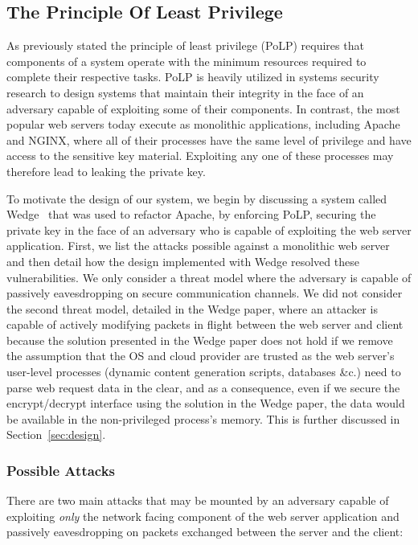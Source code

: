 \documentclass[../main.tex]{subfiles}
\begin{document}
     
\subsection{The Principle Of Least Privilege}     

As previously stated the principle of least privilege (PoLP) requires that
components of a system operate with the minimum resources required to complete
their respective tasks. PoLP is heavily utilized in systems security research to
design systems that maintain their integrity in the face of an adversary capable
of exploiting some of their components. In contrast, the most popular web
servers today execute as monolithic applications, including Apache and NGINX,
where all of their processes have the same level of privilege and have access to
the sensitive key material. Exploiting any one of these processes may therefore
lead to leaking the private key.

To motivate the design of our system, we begin by discussing a system called
Wedge~\cite{Bittau08} that was used to refactor Apache, by enforcing PoLP,
securing the private key in the face of an adversary who is capable of
exploiting the web server application. First, we list the attacks possible
against a monolithic web server and then detail how the design implemented
with Wedge resolved these vulnerabilities. We only consider a threat model 
where the adversary is capable of passively eavesdropping on secure
communication channels. We did not consider the second threat model, detailed in
the Wedge paper, where an attacker is capable of actively modifying packets in
flight between the web server and client because the solution presented in the
Wedge paper does not hold if we remove the assumption that the OS and cloud
provider are trusted as the web server's user-level processes (dynamic content
generation scripts, databases \&c.) need to parse web request data in the
clear, and as a consequence, even if we secure the encrypt/decrypt interface
using the solution in the Wedge paper, the data would be available in the
non-privileged process's memory. This is further discussed in 
Section~\ref{sec:design}.

\subsubsection*{Possible Attacks}

There are two main attacks that may be mounted by an adversary capable of
exploiting \textit{only} the network facing component of the web server
application and passively eavesdropping on packets exchanged between the server
and the client:
\end{document}
